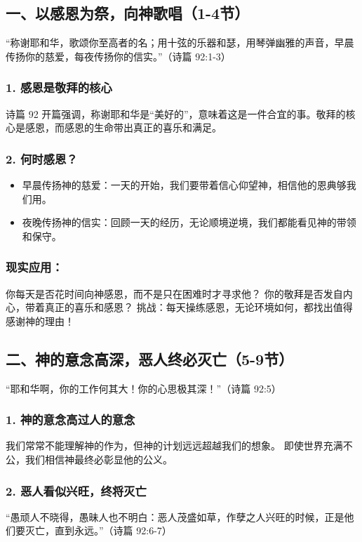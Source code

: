 \documentclass[a4paper, 12pt]{article}
\begin{document}
\subsection*{一、以感恩为祭，向神歌唱（1-4节）}
“称谢耶和华，歌颂你至高者的名；用十弦的乐器和瑟，用琴弹幽雅的声音，早晨传扬你的慈爱，每夜传扬你的信实。”（诗篇 92:1-3）

\subsubsection*{1. 感恩是敬拜的核心}
诗篇 92 开篇强调，称谢耶和华是“美好的”，意味着这是一件合宜的事。敬拜的核心是感恩，而感恩的生命带出真正的喜乐和满足。

\subsubsection*{2. 何时感恩？}
\begin{itemize}
    \item 早晨传扬神的慈爱：一天的开始，我们要带着信心仰望神，相信他的恩典够我们用。

    \item 夜晚传扬神的信实：回顾一天的经历，无论顺境逆境，我们都能看见神的带领和保守。

\end{itemize}
\subsubsection*{现实应用：}

你每天是否花时间向神感恩，而不是只在困难时才寻求他？
你的敬拜是否发自内心，带着真正的喜乐和感恩？
挑战：每天操练感恩，无论环境如何，都找出值得感谢神的理由！

\subsection*{二、神的意念高深，恶人终必灭亡（5-9节）}
“耶和华啊，你的工作何其大！你的心思极其深！”（诗篇 92:5）

\subsubsection*{1. 神的意念高过人的意念}
我们常常不能理解神的作为，但神的计划远远超越我们的想象。
即使世界充满不公，我们相信神最终必彰显他的公义。
\subsubsection*{2. 恶人看似兴旺，终将灭亡}
“愚顽人不晓得，愚昧人也不明白：恶人茂盛如草，作孽之人兴旺的时候，正是他们要灭亡，直到永远。”（诗篇 92:6-7）
\end{document}
